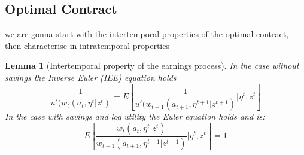 \documentclass[11pt,a4paper]{article}
\newtheorem{lemma}[theorem]{Lemma}
\begin{document}
\subsection*{Optimal Contract}
we are gonna start with the intertemporal properties of the optimal contract, then characterise in intratemporal properties

\begin{lemma}[Intertemporal property of the earnings process]
In the case without savings the Inverse Euler (IEE) equation holds
$$\frac{1}{u'(w_t(a_t,\eta^t|z^t)}=E[\frac{1}{u'(w_{t+1}(a_{t+1},\eta^{t+1}|z^{t+1})}|\eta^t,z^t]$$
In the case with savings and log utility the Euler equation holds and is:
$$E[\frac{w_t(a_t,\eta^t|z^t)}{w_{t+1}(a_{t+1},\eta^{t+1}|z^{t+1})}|\eta^t,z^t]=1$$
\end{lemma}
\end{document}
